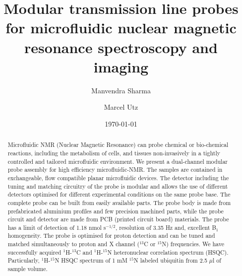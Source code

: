\documentclass[preprint,12pt]{article}
\begin{document}
\title{Modular transmission line probes for microfluidic nuclear magnetic resonance spectroscopy and imaging}
\author[1]{Manvendra Sharma}
\author[1]{Marcel Utz}
\date{\today}
\setcounter{Maxaffil}{0}
\renewcommand\Affilfont{\itshape\footnotesize}
\maketitle
\clearpage
\begin{abstract}
Microfluidic NMR (Nuclear Magnetic Resonance) can probe chemical or bio-chemical reactions, including the metabolism of cells, and tissues non-invasively in a tightly controlled and tailored microfluidic environment. We present a dual-channel modular probe assembly for  high efficiency microfluidic-NMR. The samples are contained in exchangeable, flow compatible planar microfluidic devices. The detector including the tuning and matching circuitry of the probe is modular and allows the use of different detectors optimised for different experimental conditions on the same probe base. The complete probe can be built from easily available parts. The probe body is made from prefabricated aluminium profiles and few precision machined parts, while the probe circuit and detector are made from PCB (printed circuit board) materials. The probe has a limit of detection of 1.18 nmol s$^{-1/2}$, resolution of 3.35 Hz and, excellent B$_{1}$ homogeneity. The probe is optimised for proton detection and can be tuned and matched simultaneously to proton and X channel ($^{13}$C or $^{15}$N) frequencies. We have successfully acquired $^1$H-$^{13}$C and $^1$H-$^{15}$N heteronuclear correlation spectrum (HSQC). Particularly, $^1$H-$^{15}$N HSQC spectrum of 1 mM $^{15}$N labeled ubiquitin from 2.5 $\mu$l of sample volume.
\end{abstract}
\maketitle
\clearpage
\end{document}
